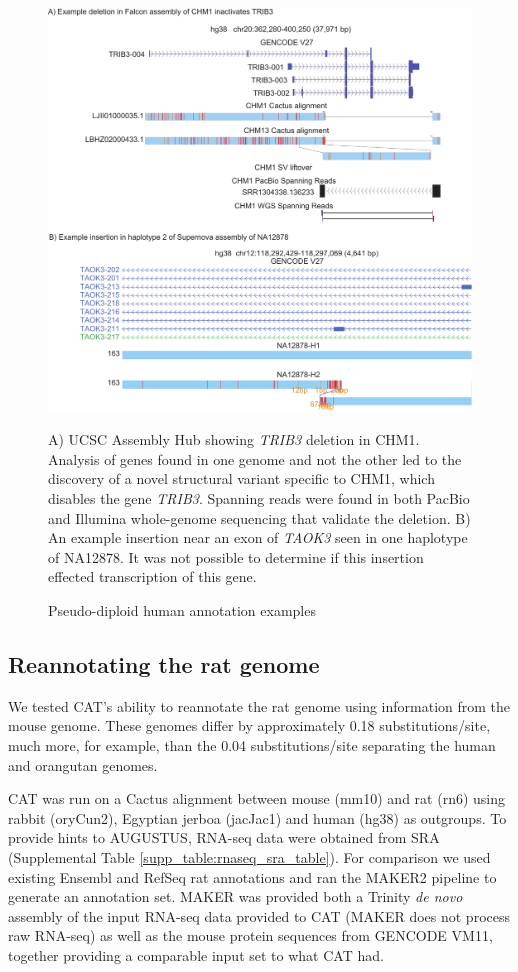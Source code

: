 \documentclass[fleqn,10pt]{wlscirep}
\begin{document}
\begin{figure}
\centering
\includegraphics[width=\textwidth,height=0.75\textheight,keepaspectratio]{human-examples.pdf}
\caption{Pseudo-diploid human annotation examples}
A) UCSC Assembly Hub\cite{nguyen2014comparative} showing \textit{TRIB3} deletion in CHM1. Analysis of genes found in one genome and not the other led to the discovery of a novel structural variant specific to CHM1, which disables the gene \textit{TRIB3}. Spanning reads were found in both PacBio and Illumina whole-genome sequencing that validate the deletion. B) An example insertion near an exon of \textit{TAOK3} seen in one haplotype of NA12878. It was not possible to determine if this insertion effected transcription of this gene.
\label{fig:human_example}
\end{figure}

\subsection*{Reannotating the rat genome}

We tested CAT's ability to reannotate the rat genome using information from the mouse genome. These genomes differ by approximately 0.18 substitutions/site, much more, for example, than the 0.04 substitutions/site separating the human and orangutan genomes\cite{karolchik2003ucsc}.

CAT was run on a Cactus alignment between mouse (mm10) and rat (rn6) using rabbit (oryCun2), Egyptian jerboa (jacJac1) and human (hg38) as outgroups. To provide hints to AUGUSTUS, RNA-seq data were obtained from SRA \cite{fushan2015gene,cortez2014origins,liu2016identification} (Supplemental Table \ref{supp_table:rnaseq_sra_table}). For comparison we used existing Ensembl and RefSeq rat annotations and ran the MAKER2 pipeline \cite{cantarel2008maker} to generate an annotation set. MAKER was provided both a Trinity \cite{haas2013novo} \textit{de novo} assembly of the input RNA-seq data provided to CAT (MAKER does not process raw RNA-seq) as well as the mouse protein sequences from GENCODE VM11, together providing a comparable input set to what CAT had. 
  
\end{document}
